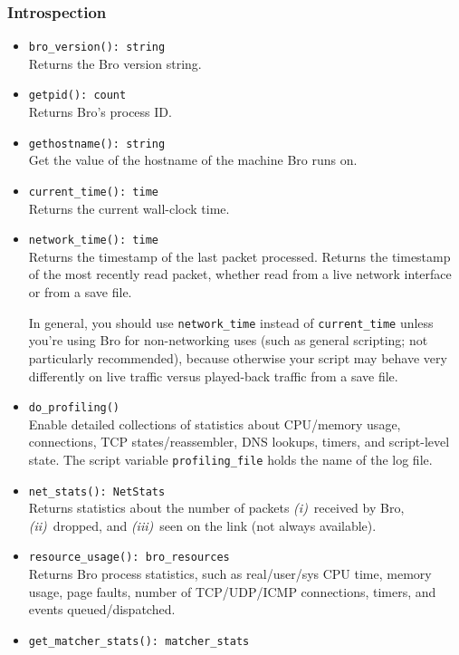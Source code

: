 \documentclass[10pt,landscape]{article}
\newcommand{\verbose}[1]{#1}
\newcommand{\verbose}[1]{}
\newcommand{\first}{\emph{(i)}~}
\newcommand{\second}{\emph{(ii)}~}
\newcommand{\third}{\emph{(iii)}~}
\begin{document}
\begin{multicols*}{2}
\subsubsection*{Introspection}

\begin{itemize}
  \item \verb|bro_version(): string|\\
    Returns the Bro version string.
  \item \verb|getpid(): count|\\
    Returns Bro's process ID.
  \item \verb|gethostname(): string|\\
    Get the value of the hostname of the machine Bro runs on.
  \item \verb|current_time(): time|\\
    Returns the current wall-clock time.
  \item \verb|network_time(): time|\\
    Returns the timestamp of the last packet processed.
    Returns the timestamp of the most recently read packet, whether read from a
    live network interface or from a save file. 
\verbose{
    In general, you should use \verb|network_time| instead of
    \verb|current_time| unless you're using Bro for non-networking uses (such
    as general scripting; not particularly recommended), because otherwise your
    script may behave very differently on live traffic versus played-back
    traffic from a save file.
  \item \verb|do_profiling()|\\
    Enable detailed collections of statistics about CPU/memory usage,
    connections, TCP states/reassembler, DNS lookups, timers, and script-level
    state. The script variable \verb|profiling_file| holds the name of the log
    file.
  \item \verb|net_stats(): NetStats|\\
    Returns statistics about the number of packets
    \first received by Bro,
    \second dropped,
    and \third seen on the link (not always available).
  \item \verb|resource_usage(): bro_resources|\\
    Returns Bro process statistics, such as real/user/sys CPU time, memory
    usage, page faults, number of TCP/UDP/ICMP connections, timers, and events
    queued/dispatched.
  \item \verb|get_matcher_stats(): matcher_stats|\\
}
\end{itemize}
\end{multicols*}
\end{document}
